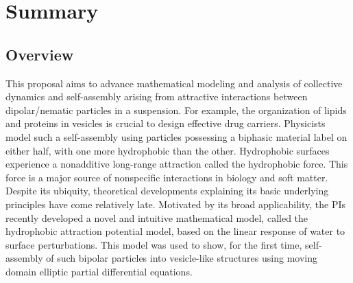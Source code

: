 \documentclass[10pt]{article}
\begin{document}
\section*{Summary}


\subsection*{Overview}
\vspace{-0.1in}
This proposal aims to advance mathematical modeling and analysis of
collective dynamics and self-assembly arising from attractive
interactions between dipolar/nematic particles in a suspension. For
example, the organization of lipids and proteins in vesicles is crucial
to design effective drug carriers. Physicists model such a self-assembly
using particles possessing a biphasic material label on either half,
with one more hydrophobic than the other. Hydrophobic surfaces
experience a nonadditive long-range attraction called the hydrophobic
force. This force is a major source of nonspecific interactions in
biology and soft matter. Despite its ubiquity, theoretical developments
explaining its basic underlying principles have come relatively late.
Motivated by its broad applicability, the PIs recently developed a novel
and intuitive mathematical model, called the hydrophobic attraction
potential model, based on the linear response of water to surface
perturbations. This model was used to show, for the first time,
self-assembly of such bipolar particles into vesicle-like structures
using moving domain elliptic partial differential equations.



\end{document}
